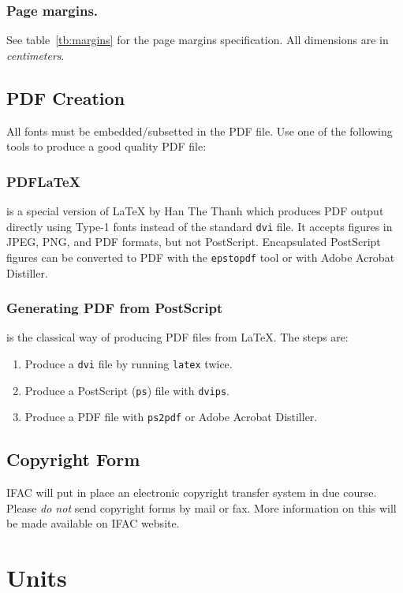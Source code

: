 \documentclass{ifacconf}
\begin{document}
\subsubsection{Page margins.} See table~\ref{tb:margins} for the
page margins specification. All dimensions are in \emph{centimeters}.


\subsection{PDF Creation}

All fonts must be embedded/subsetted in the PDF file. Use one of the
following tools to produce a good quality PDF file:

\subsubsection{PDFLaTeX} is a special version of LaTeX by Han The
Thanh which produces PDF output directly using Type-1 fonts instead of
the standard \texttt{dvi} file. It accepts figures in JPEG, PNG, and PDF
formats, but not PostScript. Encapsulated PostScript figures can be
converted to PDF with the \texttt{epstopdf} tool or with Adobe Acrobat
Distiller.

\subsubsection{Generating PDF from PostScript} is the classical way of
producing PDF files from LaTeX. The steps are:

\begin{enumerate}
  \item Produce a \texttt{dvi} file by running \texttt{latex} twice.
  \item Produce a PostScript (\texttt{ps}) file with \texttt{dvips}.
  \item Produce a PDF file with \texttt{ps2pdf} or Adobe Acrobat
  Distiller.
\end{enumerate}

\subsection{Copyright Form}

IFAC will put in place an electronic copyright transfer system in due
course. Please \emph{do not} send copyright forms by mail or fax. More
information on this will be made available on IFAC website.


\section{Units}
\end{document}
